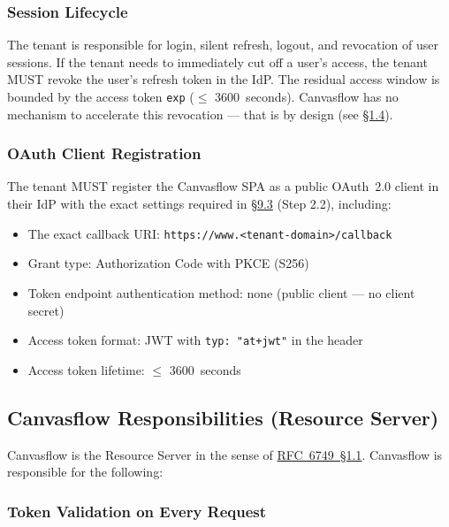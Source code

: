\subsubsection{Session Lifecycle}\label{sec:session-lifecycle}

The tenant is responsible for login, silent refresh, logout, and revocation of user
sessions. If the tenant needs to immediately cut off a user's access, the tenant MUST
revoke the user's refresh token in the IdP. The residual access window is bounded by
the access token \texttt{exp} ($\leq$ 3600~seconds). Canvasflow has no mechanism to
accelerate this revocation --- that is by design (see \hyperref[sec:out-of-scope]{\S1.4}).



\subsubsection{OAuth Client Registration}

The tenant MUST register the Canvasflow SPA as a public OAuth~2.0 client in their IdP
with the exact settings required in \hyperref[sec:tenant-side-setup]{\S9.3} (Step 2.2), including:

\begin{itemize}
  \item The exact callback URI: \texttt{https://www.<tenant-domain>/callback}
  \item Grant type: Authorization Code with PKCE (S256)
  \item Token endpoint authentication method: none (public client --- no client secret)
  \item Access token format: JWT with \texttt{typ: "at+jwt"} in the header
  \item Access token lifetime: $\leq$ 3600~seconds
\end{itemize}

\pagebreak

\subsection{Canvasflow Responsibilities (Resource Server)}\label{sec:canvasflow-responsibilities}

Canvasflow is the Resource Server in the sense of 
\href{https://datatracker.ietf.org/doc/html/rfc6749#section-1.1}{RFC~6749~\S1.1}. 
Canvasflow is responsible for the following:

\subsubsection{Token Validation on Every Request}

